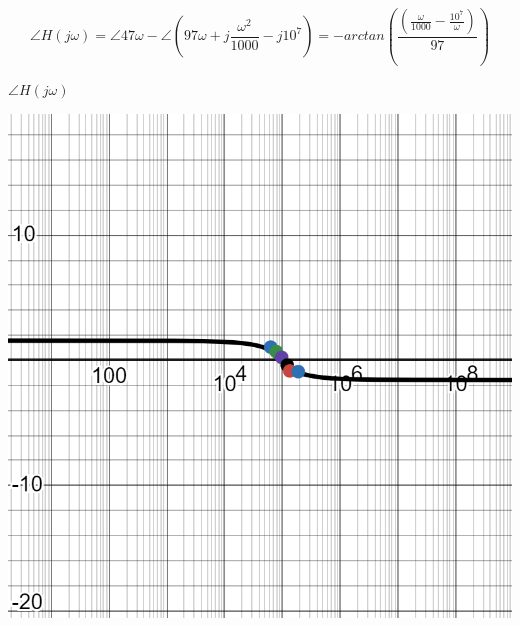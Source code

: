 \documentclass[a4 paper]{article}
\begin{document}
\newpage
\[\angle H(j\omega) = \angle 47\omega - \angle\left(97\omega+j\frac{\omega^2}{1000} -j10^7\right)=-arctan\left(\frac{\left(\frac{\omega}{1000}-\frac{10^7}{\omega}\right)}{97}\right)\]

\hspace{0.5cm}$\angle H(j\omega)$
\begin{table}[h]
\centering
\includegraphics[scale=0.45]{figuras/circ2-fase}
\end{table}\vspace{-6.75cm}\marginpar{\textbf{$\omega$}}
\vspace{6.5cm}
\end{document}
